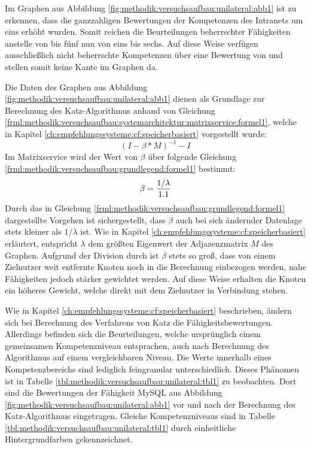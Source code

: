 Im Graphen aus Abbildung \ref{fig:methodik:versuchsaufbau:unilateral:abb1} ist zu erkennen, dass die ganzzahligen Bewertungen der Kompetenzen des Intranets um eins erhöht wurden. Somit reichen die Beurteilungen beherrschter Fähigkeiten anstelle von \nullWert bis fünf nun von eins bis sechs. Auf diese Weise verfügen ausschließlich nicht beherrschte Kompetenzen über eine Bewertung von \nullWert und stellen somit keine Kante im Graphen da.

Die Daten des Graphen aus Abbildung \ref{fig:methodik:versuchsaufbau:unilateral:abb1} dienen als Grundlage zur Berechnung des Katz-Algorithmus anhand von Gleichung \ref{frml:methodik:versuchsaufbau:systemarchitektur:matrixservice:formel1}, welche in Kapitel \ref{ch:empfehlungssysteme:cf:speicherbasiert} vorgestellt wurde:
\begin{equation}
	(I - \beta * M)^{-1} - I
	\label{frml:methodik:versuchsaufbau:systemarchitektur:matrixservice:formel1}
\end{equation}
Im Matrixservice wird der Wert von $\beta$ über folgende Gleichung \ref{frml:methodik:versuchsaufbau:grundlegend:formel1} bestimmt:
\begin{equation}
	\beta = \frac{1/\lambda}{1.1}
	\label{frml:methodik:versuchsaufbau:grundlegend:formel1}
\end{equation}
Durch das in Gleichung \ref{frml:methodik:versuchsaufbau:grundlegend:formel1} dargestellte Vorgehen ist sichergestellt, dass $\beta$ auch bei sich ändernder Datenlage stets kleiner als $1/\lambda$ ist. Wie in Kapitel \ref{ch:empfehlungssysteme:cf:speicherbasiert} erläutert, entspricht $\lambda$ dem größten Eigenwert der Adjazenzmatrix $M$ des Graphen. Aufgrund der Division durch \nenner ist $\beta$ stets so groß, dass von einem Zielnutzer weit entfernte Knoten noch in die Berechnung einbezogen werden, nahe Fähigkeiten jedoch stärker gewichtet werden. Auf diese Weise erhalten die Knoten ein höheres Gewicht, welche direkt mit dem Zielnutzer in Verbindung stehen.

Wie in Kapitel \ref{ch:empfehlungssysteme:cf:speicherbasiert} beschrieben, ändern sich bei Berechnung des Verfahrens von Katz die Fähigkeitsbewertungen. Allerdings befinden sich die Beurteilungen, welche ursprünglich einem gemeinsamen Kompetenzniveau entsprachen, auch nach Berechnung des Algorithmus auf einem vergleichbaren Niveau. Die Werte innerhalb eines Kompetenzbereichs sind lediglich feingranular unterschiedlich. Dieses Phänomen ist in Tabelle \ref{tbl:methodik:versuchsaufbau:unilateral:tbl1} zu beobachten. Dort sind die Bewertungen der Fähigkeit MySQL aus Abbildung \ref{fig:methodik:versuchsaufbau:unilateral:abb1} vor und nach der Berechnung des Katz-Algorithmus eingetragen. Gleiche Kompetenzniveaus sind in Tabelle \ref{tbl:methodik:versuchsaufbau:unilateral:tbl1} durch einheitliche Hintergrundfarben gekennzeichnet.

